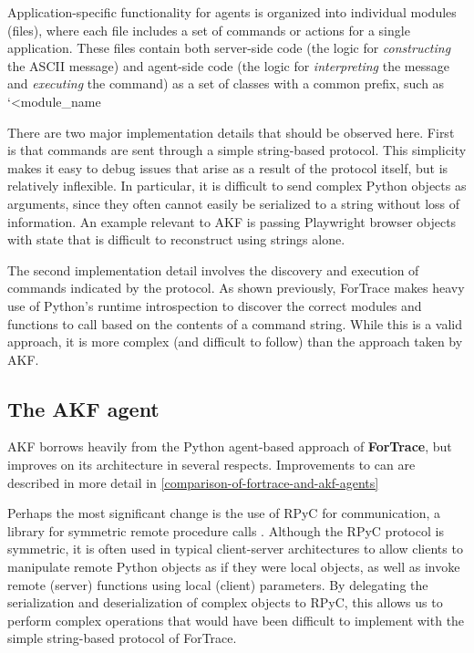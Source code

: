 \documentclass[letterpaper,12pt]{report}
\begin{document}
Application-specific functionality for agents is organized into
individual modules (files), where each file includes a set of commands
or actions for a single application. These files contain both
server-side code (the logic for \emph{constructing} the ASCII message)
and agent-side code (the logic for \emph{interpreting} the message and
\emph{executing} the command) as a set of classes with a common prefix,
such as `\textless module\_name

There are two major implementation details that should be observed here.
First is that commands are sent through a simple string-based protocol.
This simplicity makes it easy to debug issues that arise as a result of
the protocol itself, but is relatively inflexible. In particular, it is
difficult to send complex Python objects as arguments, since they often
cannot easily be serialized to a string without loss of information. An
example relevant to AKF is passing Playwright browser objects with state
that is difficult to reconstruct using strings alone.

The second implementation detail involves the discovery and execution of
commands indicated by the protocol. As shown previously, ForTrace makes
heavy use of Python's runtime introspection to discover the correct
modules and functions to call based on the contents of a command string.
While this is a valid approach, it is more complex (and difficult to
follow) than the approach taken by AKF.

\subsection{The AKF agent}\label{the-akf-agent}

AKF borrows heavily from the Python agent-based approach of
\textbf{ForTrace}, but improves on its architecture in several respects.
Improvements to can are described in more detail in \autoref{comparison-of-fortrace-and-akf-agents}

Perhaps the most significant change is the use of RPyC for
communication, a library for symmetric remote procedure calls
\cite{TomerfilibaorgRpyc2025}. Although the RPyC protocol is
symmetric, it is often used in typical client-server architectures to
allow clients to manipulate remote Python objects as if they were local
objects, as well as invoke remote (server) functions using local
(client) parameters. By delegating the serialization and deserialization
of complex objects to RPyC, this allows us to perform complex operations
that would have been difficult to implement with the simple string-based
protocol of ForTrace.
\end{document}
